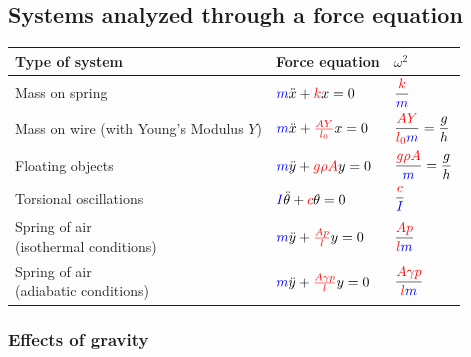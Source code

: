 \documentclass[11pt,letterpaper,titlepage,oneside]{book}
\begin{document}
\subsection{Systems analyzed through a force equation}
\begin{center}
	\renewcommand{\arraystretch}{2.5}
\begin{tabular}{lll}
	\hline
	Type of system & Force equation & $\omega^2$ \\ \hline
	Mass on spring &
		$\textcolor{blue}{m}\ddot{x} + \textcolor{red}{k}x = 0$ &
		$\dfrac{\color{red}{k}}{\color{blue}m}$
		\\
	\parbox{4cm}{Mass on wire \\\footnotesize{(with Young's Modulus $Y$)}} &
		$\textcolor{blue}{m}\ddot{x} + \textcolor{red}{\frac{AY}{l_0}}x = 0$ &
		$\dfrac{\color{red}{AY}}{\color{red}{l_0}\color{blue}m} = \dfrac{g}{h}$ 
		\\
	Floating objects &
		$\textcolor{blue}{m}\ddot{y} + \textcolor{red}{g\rho A}y = 0$ &
		$\dfrac{\color{red}{g\rho A}}{\color{blue}m} = \dfrac{g}{h}$ 
		\\
	Torsional oscillations &
		$\textcolor{blue}{I}\ddot{\theta} + \textcolor{red}{c}\theta = 0$ &
		$\dfrac{\color{red}{c}}{\color{blue}I}$ 
		\\
	\parbox{3.5cm}{Spring of air \\\footnotesize{(isothermal conditions)}} &
		$\textcolor{blue}{m}\ddot{y} + \textcolor{red}{\frac{Ap}{l}}y = 0$ &
		$\dfrac{\color{red}{Ap}}{\color{red}{l}\color{blue}m}$ 
		\\
	\parbox{3.5cm}{Spring of air \\\footnotesize{(adiabatic conditions)}} &
		$\textcolor{blue}{m}\ddot{y} + \textcolor{red}{\frac{A\gamma p}{l}}y = 0$ &
		$\dfrac{\color{red}{A\gamma p}}{\color{red}{l}\color{blue}m}$ 
		\\
	\hline
\end{tabular}
\renewcommand{\arraystretch}{1}
\end{center}


\subsubsection{Effects of gravity}
\end{document}
